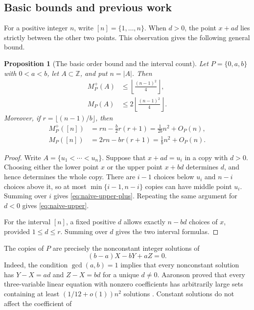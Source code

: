 \documentclass[11pt]{article}
\numberwithin{equation}{section}
\newtheorem{proposition}[proposition]{Proposition}
\theoremstyle{remark}
\newcommand{\Z}{\mathbb Z}
\begin{document}
\subsection*{Basic bounds and previous work}
For a positive integer $n$, write $[n]=\{1,\ldots,n\}$. When $d>0$, the point $x+ad$ lies strictly between the other two points.
This observation gives the following general bound.
\begin{proposition}[The basic order bound and the interval count]
\label{prop:benchmarks}
Let $P=\{0,a,b\}$ with $0<a<b$, let $A\subset\Z$, and put $n=|A|$.
Then
\begin{align}
 M_P^+(A)&\le \left\lfloor\frac{(n-1)^2}{4}\right\rfloor,
 \label{eq:naive-upper-plus}\\
 M_P(A)&\le 2\left\lfloor\frac{(n-1)^2}{4}\right\rfloor.
 \label{eq:naive-upper}
\end{align}
Moreover, if $r=\lfloor(n-1)/b\rfloor$, then
\begin{align}
 M_P^+([n])&=rn-\frac b2r(r+1)=\frac1{2b}n^2+O_P(n),
 \label{eq:interval-general-plus}\\
 M_P([n])&=2rn-br(r+1)=\frac1b n^2+O_P(n).
 \label{eq:interval-general}
\end{align}
\end{proposition}
\begin{proof}
Write $A=\{u_1<\cdots<u_n\}$.  Suppose that $x+ad=u_i$ in a copy with
$d>0$.  Choosing either the lower point $x$ or the upper point $x+bd$
determines $d$, and hence determines the whole copy.  There are $i-1$
choices below $u_i$ and $n-i$ choices above it, so at most
$\min\{i-1,n-i\}$ copies can have middle point $u_i$.  Summing over $i$
gives \eqref{eq:naive-upper-plus}.  Repeating the same argument for $d<0$
gives \eqref{eq:naive-upper}.

For the interval $[n]$, a fixed positive $d$ allows exactly $n-bd$ choices
of $x$, provided $1\le d\le r$.  Summing over $d$ gives the two interval
formulas.
\end{proof}
The copies of $P$ are precisely the nonconstant integer solutions of
\begin{equation}\label{eq:general-pattern-equation}
 (b-a)X-bY+aZ=0.
\end{equation}
Indeed, the condition $\gcd(a,b)=1$ implies that every nonconstant solution
has $Y-X=ad$ and $Z-X=bd$ for a unique $d\ne0$.  Aaronson proved that every
three-variable linear equation with nonzero coefficients has arbitrarily
large sets containing at least $(1/12+o(1))n^2$ solutions
\cite{Aaronson}.  Constant solutions do not affect the coefficient of
\end{document}
